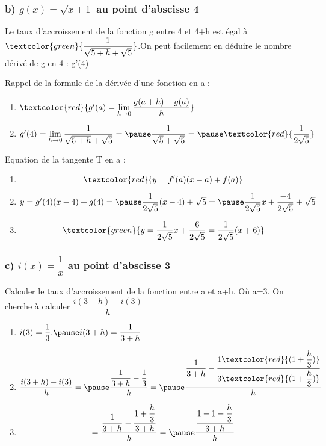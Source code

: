 \documentclass[t]{beamer}
\begin{document}
	\begin{frame}[label=pagebanale]
		\frametitle{b) $g(x) = \sqrt{x+1}$ au point d'abscisse 4}
		\pause
		Le taux d'accroissement de la fonction g entre 4 et 4+h est égal à \pause $\textcolor{green}{\dfrac{1}{\sqrt{5+h} + \sqrt{5}}}$.\pause On peut facilement en déduire le nombre dérivé de g en 4 : g'(4)

		\pause
		Rappel de la formule de la dérivée d'une fonction en a :
		\pause 
		\begin{enumerate}[]
			\item<+-> \(\textcolor{red}{g'(a) = \lim\limits_{h \rightarrow 0}\dfrac{g(a+h)-g(a)}{h}}\)
			\item<+-> \(g'(4) = \lim\limits_{h \rightarrow 0}\dfrac{1}{\sqrt{5+h} + \sqrt{5}} = \pause \dfrac{1}{\sqrt{5} + \sqrt{5}} = \pause \textcolor{red}{\dfrac{1}{2\sqrt{5}}}\)
			\pause
		\end{enumerate}

		Equation de la tangente T en a :
		\pause
		\begin{enumerate}[]
			\item<+-> \[\textcolor{red}{y = f'(a)(x-a) + f(a)}\]
			\item<+-> \(y=g'(4)(x-4) + g(4) = \pause \dfrac{1}{2 \sqrt{5}}(x-4) + \sqrt{5}  = \pause \dfrac{1}{2 \sqrt{5}}x + \dfrac{-4}{2 \sqrt{5}} + \sqrt{5} \)
			\pause
			\item<+-> \[\textcolor{green}{y = \dfrac{1}{2\sqrt{5}}x + \dfrac{6}{2\sqrt{5}} = \dfrac{1}{2\sqrt{5}}(x + 6)} \]
		\end{enumerate}
	\end{frame}

	\begin{frame}
		\frametitle{c) $i(x) = \dfrac{1}{x}$ au point d'abscisse 3}
		\pause
		Calculer le taux d'accroissement de la fonction entre a et a+h. \pause Où a=3.
		\pause
		On cherche à calculer \( \dfrac{i(3+h) - i(3)}{h} \)
		\pause
		\begin{enumerate}[]
			\item<+-> \(i(3) = \dfrac{1}{3}. \pause i(3+h) = \dfrac{1}{3+h}\) 
			\pause
			\item<+-> \[\dfrac{i(3+h) - i(3)}{h} = \pause \dfrac{\dfrac{1}{3+h} - \dfrac{1}{3} }{h} = \pause \dfrac{\dfrac{1}{3+h}-\dfrac{1\textcolor{red}{(1+\dfrac{h}{3})}}{3\textcolor{red}{(1+\dfrac{h}{3})}}}{h}\]
			\pause
			\item<+-> \[ = \dfrac{\dfrac{1}{3+h}-\dfrac{1+\dfrac{h}{3}}{3+h}}{h} = \pause \dfrac{\dfrac{1-1-\dfrac{h}{3}}{3+h}}{h} \]
		\end{enumerate}
	\end{frame}
\end{document}
